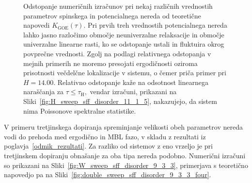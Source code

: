  \begin{figure}[H]
\caption{Odstopanje numeričnih izračunov pri nekaj različnih vrednostih parametrov spinskega in potencialnega nereda od teoretične napovedi $K_\mathrm{GOE}(\tau).$ Pri prvih treh vrednostih potencialnega nereda lahko jasno razločimo območje neuniverzalne relaksacije in območje univerzalne linearne rasti, ko se odstopanje ustali in fluktuira okrog povprečne vrednosti. Zgolj na podlagi relativnega odstopanja v mejnih primerih ne moremo presojati ergodičnosti oziroma prisotnosti večdelčne lokalizacije v sistemu, o čemer priča primer pri $H=14.00.$ Relativno odstopanje kaže na odsotnost linearnega naraščanja za $\tau\leq\tau_\mathrm{H},$ vendar izračuni, prikazani na Sliki~\ref{fig:H_sweep_sff_disorder_11_1_5}, nakazujejo, da sistem nima Poissonove spektralne statistike. }
\label{fig:double_sweep_sff_disorder_11_1_5_four}
\end{figure}
\newpage
\noindent	 
V primeru tretjinskega dopiranja spreminjanje velikosti obeh parametrov nereda vodi do prehoda med ergodično in MBL fazo, v skladu z rezultati iz poglavja~\ref{odmik_rezultati}. Za razliko od sistemov z eno vrzeljo je pri tretjinskem dopiranju obnašanje za oba tipa nereda podobno. Numerični izračuni so prikazani na Sliki~\ref{fig:W_sweep_sff_disorder_9_3_3}, primerjava s teoretično napovedjo pa na Sliki~\ref{fig:double_sweep_sff_disorder_9_3_3_four}.
